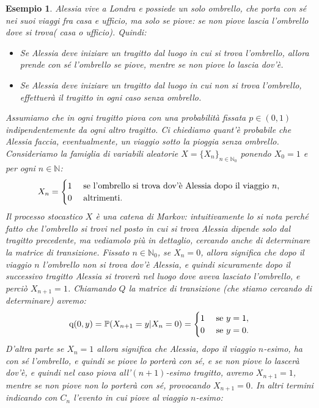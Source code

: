 \documentclass[11pt]{book}
\theoremstyle{Definizione}
\theoremstyle{TeoremaProposizioneLemmaCorollario}
\theoremstyle{OsservazioneNota}
\newtheorem{myes}{Esempio}[section]
\newcommand{\N}{\mathbb{N}}
\renewcommand{\P}{\mathbb{P}}
\newcommand{\q}{\textup{q}}
\begin{document}
\begin{myes}
Alessia vive a Londra e possiede un solo ombrello, che porta con sé nei suoi viaggi fra casa e ufficio, ma solo se piove: se non piove lascia l'ombrello dove si trova( casa o ufficio). Quindi:
\begin{itemize}
\item Se Alessia deve iniziare un tragitto dal luogo in cui si trova l'ombrello, allora prende con sé l'ombrello se piove, mentre se non piove lo lascia dov'è.
\item Se Alessia deve iniziare un tragitto dal luogo in cui non si trova l'ombrello, effettuerà il tragitto in ogni caso senza ombrello.
\end{itemize}
Assumiamo che in ogni tragitto piova con una probabilità fissata $p\in (0,1)$ indipendentemente da ogni altro tragitto. Ci chiediamo quant'è probabile che Alessia faccia, eventualmente, un viaggio sotto la pioggia senza ombrello.\\
Consideriamo la famiglia di variabili aleatorie $X = \{X_n\}_{n\in \N_0}$ ponendo $X_0 = 1$ e per ogni $n\in \N$:
$$
X_n = \begin{cases}
1 &\textup{ se l'ombrello si trova dov'è Alessia dopo il viaggio }n,\\
0 &\textup{ altrimenti}.
\end{cases}
$$
Il processo stocastico $X$ è una catena di Markov: intuitivamente lo si nota perché fatto che l'ombrello si trovi nel posto in cui si trova Alessia dipende solo dal tragitto precedente, ma vediamolo più in dettaglio, cercando anche di determinare la matrice di transizione. Fissato $n\in \N_0$, se $X_n = 0$, allora significa che dopo il viaggio $n$ l'ombrello non si trova dov'è Alessia, e quindi sicuramente dopo il successivo tragitto Alessia si troverà nel luogo dove aveva lasciato l'ombrello, e perciò $X_{n+1} = 1$. Chiamando $Q$ la matrice di transizione (che stiamo cercando di determinare) avremo:
$$
\q(0,y) = \P(X_{n+1} = y | X_n = 0) = \begin{cases}
1 &\textup{ se }y = 1,\\
0 &\textup{ se }y = 0.
\end{cases}
$$
D'altra parte se $X_n = 1$ allora significa che Alessia, dopo il viaggio $n$-esimo, ha con sé l'ombrello, e quindi se piove lo porterà con sé, e se non piove lo lascerà dov'è, e quindi nel caso piova all'$(n+1)$-esimo tragitto, avremo $X_{n+1} = 1$, mentre se non piove non lo porterà con sé, provocando $X_{n+1} = 0$. In altri termini indicando con $C_n$ l'evento in cui piove al viaggio $n$-esimo:

\end{myes}
\end{document}
